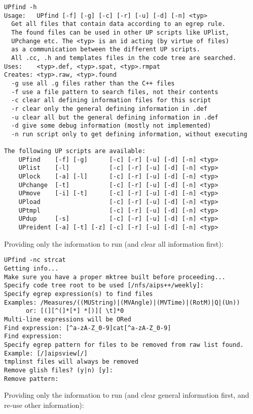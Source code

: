 \begin{verbatim}
UPfind -h 
Usage:   UPfind [-f] [-g] [-c] [-r] [-u] [-d] [-n] <typ>
  Get all files that contain data according to an egrep rule.
  The found files can be used in other UP scripts like UPlist, 
  UPchange etc. The <typ> is an id acting (by virtue of files) 
  as a communication between the different UP scripts.
  All .cc, .h and templates files in the code tree are searched.
Uses:    <typ>.def, <typ>.spat, <typ>.rmpat
Creates: <typ>.raw, <typ>.found
  -g use all .g files rather than the C++ files
  -f use a file pattern to search files, not their contents
  -c clear all defining information files for this script
  -r clear only the general defining information in .def
  -u clear all but the general defining information in .def
  -d give some debug information (mostly not implemented)
  -n run script only to get defining information, without executing

The following UP scripts are available:
    UPfind    [-f] [-g]      [-c] [-r] [-u] [-d] [-n] <typ>
    UPlist    [-l]           [-c] [-r] [-u] [-d] [-n] <typ>         
    UPlock    [-a] [-l]      [-c] [-r] [-u] [-d] [-n] <typ>
    UPchange  [-t]           [-c] [-r] [-u] [-d] [-n] <typ>
    UPmove    [-i] [-t]      [-c] [-r] [-u] [-d] [-n] <typ>
    UPload                   [-c] [-r] [-u] [-d] [-n] <typ>
    UPtmpl                   [-c] [-r] [-u] [-d] [-n] <typ>
    UPdup     [-s]           [-c] [-r] [-u] [-d] [-n] <typ>
    UPreident [-a] [-t] [-z] [-c] [-r] [-u] [-d] [-n] <typ>
\end{verbatim}

\noindent
Providing only the information to run (and clear all information first):

\begin{verbatim}
UPfind -nc strcat
Getting info...
Make sure you have a proper mktree built before proceeding...
Specify code tree root to be used [/nfs/aips++/weekly]: 
Specify egrep expression(s) to find files
Examples: /Measures/((MUString)|(MVAngle)|(MVTime)|(RotM)|Q|(Un))
      or: [(][^(]*[*] *[)][ \t]*0
Multi-line expressions will be ORed
Find expression: [^a-zA-Z_0-9]cat[^a-zA-Z_0-9]
Find expression: 
Specify egrep pattern for files to be removed from raw list found.
Example: [/]aipsview[/]
tmplinst files will always be removed
Remove glish files? (y|n) [y]: 
Remove pattern: 
\end{verbatim}

\noindent
Providing only the information to run (and clear general information first,
and re-use other information):

